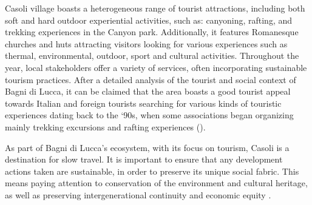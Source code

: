 \documentclass[sustainability,article,submit,pdftex,moreauthors]{Definitions/mdpi}
\begin{document}
Casoli village boasts a heterogeneous range of tourist attractions, including both soft and hard outdoor experiential activities, such as: canyoning, rafting, and trekking experiences in the Canyon park. Additionally, it features Romanesque churches and huts attracting visitors looking for various experiences such as thermal, environmental, outdoor, sport and cultural activities. Throughout the year, local stakeholders offer a variety of services, often incorporating sustainable tourism practices. After a detailed analysis of the tourist and social context of Bagni di Lucca, it can be claimed that the area boasts a good tourist appeal towards Italian and foreign tourists searching for various kinds of touristic experiences \cite{x} dating back to the ‘90s, when some associations began organizing mainly trekking excursions and rafting experiences ().

As part of Bagni di Lucca's ecosystem, with its focus on tourism, Casoli is a destination for slow travel. It is important to ensure that any development actions taken are sustainable, in order to preserve its unique social fabric. This means paying attention to conservation of the environment and cultural heritage, as well as preserving intergenerational continuity and economic equity \cite{x}.
\end{document}
